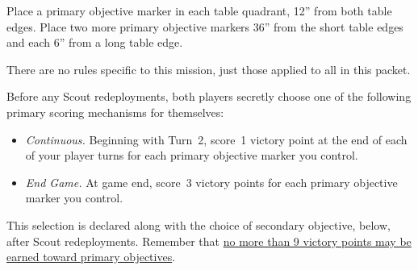 
\begin{tablesetup}

  \hammerandanvil

  \smallskip%
  Place a primary objective marker in each table quadrant, 12'' from
  both table edges.  Place two more primary objective markers 36''
  from the short table edges and each 6'' from a long table edge.

\end{tablesetup}

\begin{missionrules}

\bigskip
  There are no rules specific to this mission, just those applied to
  all in this packet.

\end{missionrules}

\begin{scoring}  
\begin{primaries}
  Before any Scout redeployments, both players secretly choose one of
  the following primary scoring mechanisms for themselves:

  \begin{itemize}
  \item {\textit{Continuous.}} Beginning with Turn~2, score~1 victory
    point at the end of each of your player turns for each primary
    objective marker you control.
  
  \item {\textit{End Game.}} At game end, score~3 victory points for
    each primary objective marker you control.  
  \end{itemize}

  This selection is declared along with the choice of secondary
  objective, below, after Scout redeployments.  Remember that
  \underline{no more than 9 victory points may be earned toward
    primary objectives}.
\end{primaries}

\begin{secondaries}
\hullbreaker
\witchhunter
\breaktheirback
\overrun
\seizeground
\end{secondaries}

\end{scoring}
